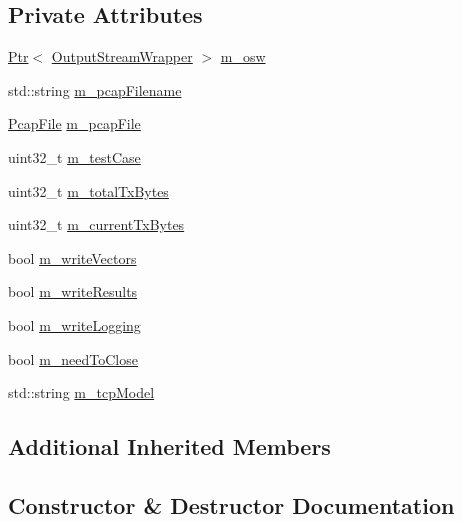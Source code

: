 \subsection*{Private Attributes}
\begin{DoxyCompactItemize}
\item 
\hyperlink{classns3_1_1Ptr}{Ptr}$<$ \hyperlink{classns3_1_1OutputStreamWrapper}{Output\+Stream\+Wrapper} $>$ \hyperlink{classNs3TcpLossTestCase_a8fa59eac8a25ec3d0b394e8b27ddc7c5}{m\+\_\+osw}
\item 
std\+::string \hyperlink{classNs3TcpLossTestCase_ae05885e96d3f3f935e6ddfcb3f534407}{m\+\_\+pcap\+Filename}
\item 
\hyperlink{classns3_1_1PcapFile}{Pcap\+File} \hyperlink{classNs3TcpLossTestCase_a6a02dbbf853025b7fe39393c1e1195ae}{m\+\_\+pcap\+File}
\item 
uint32\+\_\+t \hyperlink{classNs3TcpLossTestCase_a7a8850910d9da65bebe441babd05f979}{m\+\_\+test\+Case}
\item 
uint32\+\_\+t \hyperlink{classNs3TcpLossTestCase_ac06e95861fbb4ed79486d76a752a83d9}{m\+\_\+total\+Tx\+Bytes}
\item 
uint32\+\_\+t \hyperlink{classNs3TcpLossTestCase_a3ddd820ce273cb02ec0d500da76a88e2}{m\+\_\+current\+Tx\+Bytes}
\item 
bool \hyperlink{classNs3TcpLossTestCase_a6b4ff8445b57a44939392bb79b00d963}{m\+\_\+write\+Vectors}
\item 
bool \hyperlink{classNs3TcpLossTestCase_a8fe8477271a2be320b5111feeea6a9e8}{m\+\_\+write\+Results}
\item 
bool \hyperlink{classNs3TcpLossTestCase_a997665c1cf58a436a45b9e27766dd006}{m\+\_\+write\+Logging}
\item 
bool \hyperlink{classNs3TcpLossTestCase_afdd4755f5e27da04bf3385eab1068495}{m\+\_\+need\+To\+Close}
\item 
std\+::string \hyperlink{classNs3TcpLossTestCase_afbac387ba94a6b5cd8760f688bab5008}{m\+\_\+tcp\+Model}
\end{DoxyCompactItemize}
\subsection*{Additional Inherited Members}


\subsection{Constructor \& Destructor Documentation}
